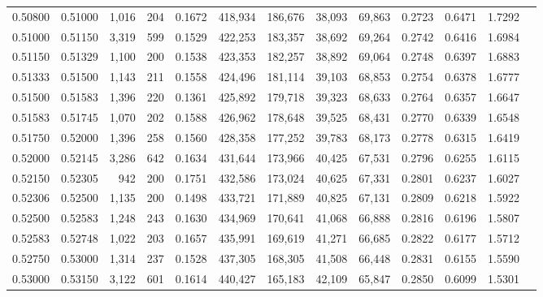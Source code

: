 \begin{tabular}{rrrrrrrrrrrrr}
0.50800 & 0.51000 & 1,016 & 204 &                                     0.1672 & 418,934 & 186,676 &  38,093 &  69,863 & 0.2723 & 0.6471 & 1.7292 \\
0.51000 & 0.51150 & 3,319 & 599 &                                     0.1529 & 422,253 & 183,357 &  38,692 &  69,264 & 0.2742 & 0.6416 & 1.6984 \\
0.51150 & 0.51329 & 1,100 & 200 &                                     0.1538 & 423,353 & 182,257 &  38,892 &  69,064 & 0.2748 & 0.6397 & 1.6883 \\
0.51333 & 0.51500 & 1,143 & 211 &                                     0.1558 & 424,496 & 181,114 &  39,103 &  68,853 & 0.2754 & 0.6378 & 1.6777 \\
0.51500 & 0.51583 & 1,396 & 220 &                                     0.1361 & 425,892 & 179,718 &  39,323 &  68,633 & 0.2764 & 0.6357 & 1.6647 \\
0.51583 & 0.51745 & 1,070 & 202 &                                     0.1588 & 426,962 & 178,648 &  39,525 &  68,431 & 0.2770 & 0.6339 & 1.6548 \\
0.51750 & 0.52000 & 1,396 & 258 &                                     0.1560 & 428,358 & 177,252 &  39,783 &  68,173 & 0.2778 & 0.6315 & 1.6419 \\
0.52000 & 0.52145 & 3,286 & 642 &                                     0.1634 & 431,644 & 173,966 &  40,425 &  67,531 & 0.2796 & 0.6255 & 1.6115 \\
0.52150 & 0.52305 &   942 & 200 &                                     0.1751 & 432,586 & 173,024 &  40,625 &  67,331 & 0.2801 & 0.6237 & 1.6027 \\
0.52306 & 0.52500 & 1,135 & 200 &                                     0.1498 & 433,721 & 171,889 &  40,825 &  67,131 & 0.2809 & 0.6218 & 1.5922 \\
0.52500 & 0.52583 & 1,248 & 243 &                                     0.1630 & 434,969 & 170,641 &  41,068 &  66,888 & 0.2816 & 0.6196 & 1.5807 \\
0.52583 & 0.52748 & 1,022 & 203 &                                     0.1657 & 435,991 & 169,619 &  41,271 &  66,685 & 0.2822 & 0.6177 & 1.5712 \\
0.52750 & 0.53000 & 1,314 & 237 &                                     0.1528 & 437,305 & 168,305 &  41,508 &  66,448 & 0.2831 & 0.6155 & 1.5590 \\
0.53000 & 0.53150 & 3,122 & 601 &                                     0.1614 & 440,427 & 165,183 &  42,109 &  65,847 & 0.2850 & 0.6099 & 1.5301 \\

\end{tabular}
